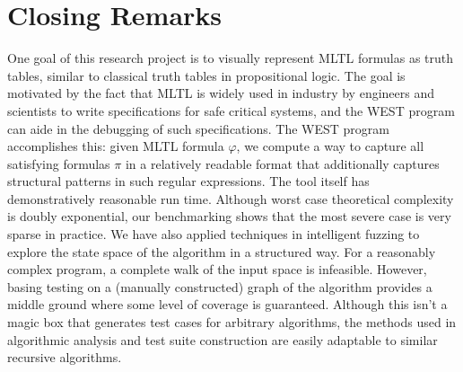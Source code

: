 \documentclass[runningheads]{llncs}
\renewcommand{\phi}{\varphi}
\begin{document}
\section{Closing Remarks}
\label{Conclusion}
 One goal of this research project is to visually represent MLTL formulas as truth tables, similar to classical truth tables in propositional logic. 
The goal is motivated by the fact that MLTL is widely used in industry by engineers and scientists to write specifications for safe critical systems, and the WEST program can aide in the debugging of such specifications. 
The WEST program accomplishes this: given MLTL formula $\phi$, we compute a way to capture all satisfying formulas $\pi$ in a relatively readable format that additionally captures structural patterns in such regular expressions. 
The tool itself has demonstratively reasonable run time. 
Although worst case theoretical complexity is doubly exponential, our benchmarking shows that the most severe case is very sparse in practice. 
We have also applied techniques in intelligent fuzzing to explore the state space of the algorithm in a structured way. 
For a reasonably complex program, a complete walk of the input space is infeasible. 
However, basing testing on a (manually constructed) graph of the algorithm provides a middle ground where some level of coverage is guaranteed. 
Although this isn't a magic box that generates test cases for arbitrary algorithms, the methods used in algorithmic analysis and test suite construction are easily adaptable to similar recursive algorithms.
\end{document}
